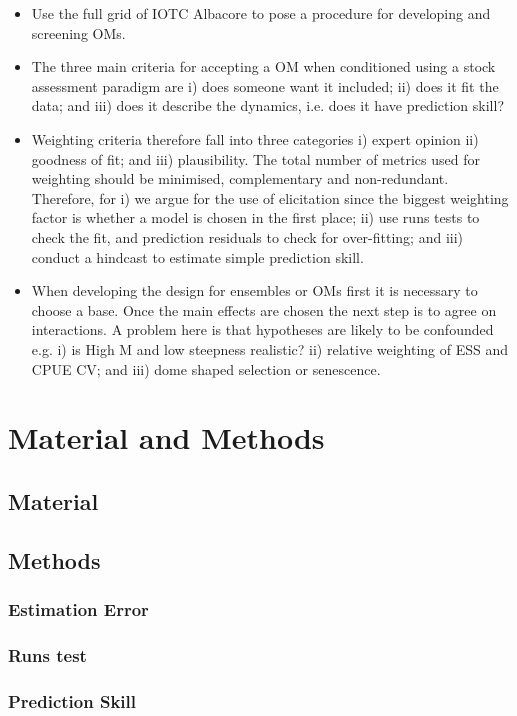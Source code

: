 \documentclass[a4paper]{article}
\begin{document}
\begin{itemize}
    \item Use the full grid of IOTC Albacore to pose a procedure for developing and screening OMs.
    \item The three main criteria for accepting a OM when conditioned using a stock assessment paradigm are i) does someone want it included; ii) does it fit the data; and iii) does it describe the dynamics, i.e. does it have prediction skill?
    \item Weighting criteria therefore fall into three categories i) expert opinion ii) goodness of fit; and iii) plausibility. The total number of metrics used for weighting should be minimised, complementary and non-redundant. Therefore, for i) we argue for the use of elicitation since the biggest weighting factor is whether a model is chosen in the first place; ii) use runs tests to check the fit, and prediction residuals to check for over-fitting; and  iii) conduct a hindcast to estimate simple prediction skill. 
    \item When developing the design for ensembles or OMs first it is necessary to choose a base. Once the main effects are chosen the next step is to agree on interactions. A problem here is that hypotheses are likely to be confounded e.g. i) is High M and low steepness realistic? ii) relative weighting of ESS and CPUE CV; and iii) dome shaped selection or senescence.
\end{itemize}

\newpage
\section*{Material and Methods}
\subsection*{Material}
\subsection*{Methods}
\subsubsection*{Estimation Error}
\subsubsection*{Runs test}
\subsubsection*{Prediction Skill}
\end{document}
